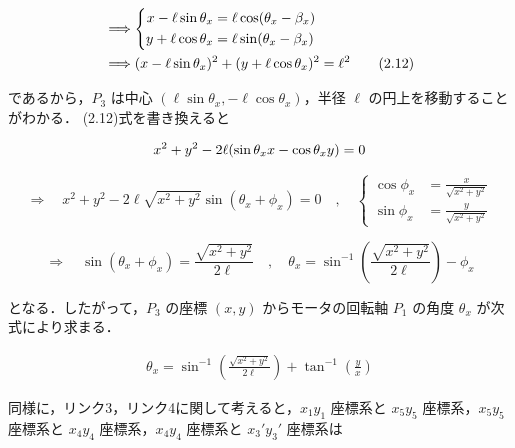     \begin{align}
    &\Longrightarrow
    \left\{
    \begin{aligned}
    x - \ell \sin\theta_x &= \ell \cos(\theta_x - \beta_x) \\
    y + \ell \cos\theta_x &= \ell \sin(\theta_x - \beta_x)
    \end{aligned}
    \right. \notag \\
    &\Longrightarrow
    (x - \ell \sin\theta_x)^2 + (y + \ell \cos\theta_x)^2 = \ell^2
    \tag{2.12}
    \end{align}
    
    
    
    であるから，$P_3$ は中心 $(\ell \sin\theta_x, -\ell \cos\theta_x)$，半径 $\ell$ の円上を移動することがわかる．
    (2.12)式を書き換えると
    
    \begin{align}
    x^2 + y^2 - 2\ell (\sin\theta_x x - \cos\theta_x y) = 0
    \notag
    \end{align}
    
    \[
    \Longrightarrow
    \quad
    x^2 + y^2 - 2\ell \sqrt{x^2 + y^2} \sin(\theta_x + \phi_x) = 0
    \quad , \quad
    \left\{
    \begin{aligned}
    \cos\phi_x &= \frac{x}{\sqrt{x^2 + y^2}} \\
    \sin\phi_x &= \frac{y}{\sqrt{x^2 + y^2}}
    \end{aligned}
    \right.
    \]
    
    \[
    \Longrightarrow
    \quad
    \sin(\theta_x + \phi_x) = \frac{\sqrt{x^2 + y^2}}{2\ell}
    \quad , \quad
    \theta_x = \sin^{-1} \left( \frac{\sqrt{x^2 + y^2}}{2\ell} \right) - \phi_x
    \tag{2.13}
    \]
    
    となる．したがって，$P_3$ の座標 $(x, y)$ からモータの回転軸 $P_1$ の角度 $\theta_x$ が次式により求まる．
    
    \begin{align}
    \theta_x = \sin^{-1} \left( \frac{\sqrt{x^2 + y^2}}{2\ell} \right) + \tan^{-1} \left( \frac{y}{x} \right)
    \tag{2.14}
    \end{align}
    
    同様に，リンク3，リンク4に関して考えると，$x_1 y_1$ 座標系と $x_5 y_5$ 座標系，$x_5 y_5$ 座標系と $x_4 y_4$ 座標系，$x_4 y_4$ 座標系と $x_3' y_3'$ 座標系は

